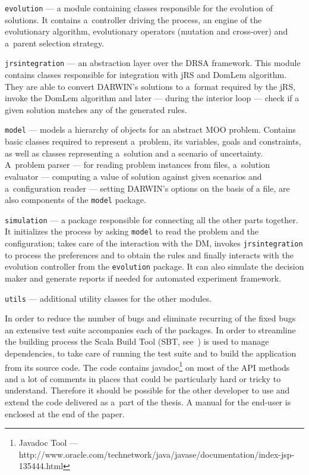 \begin{description}
  \item{\texttt{evolution}} --- a module containing classes responsible for
    the evolution of solutions. It contains a~controller driving the process,
    an engine of the evolutionary algorithm, evolutionary operators (mutation
    and cross-over) and a~parent selection strategy.

  \item{\texttt{jrsintegration}} --- an abstraction layer over the DRSA
    framework. This module contains classes responsible for integration with
    jRS and DomLem algorithm. They are able to convert DARWIN's solutions to
    a~format required by the jRS, invoke the DomLem algorithm and later ---
    during the interior loop --- check if a given solution matches any of the
    generated rules.

  \item{\texttt{model}} --- models a hierarchy of objects for an abstract MOO
    problem. Contains basic classes required to represent a~problem, its
    variables, goals and constraints, as well as classes representing
    a~solution and a scenario of uncertainty. A~problem parser --- for reading
    problem instances from files, a~solution evaluator --- computing a value
    of solution against given scenarios and a~configuration reader --- setting
    DARWIN's options on the basis of a file, are also components of the
    \texttt{model} package.
  \item{\texttt{simulation}} --- a package responsible for connecting all the
    other parts together. It initializes the process by asking \texttt{model}
    to read the problem and the configuration; takes care of the interaction
    with the DM, invokes \texttt{jrsintegration} to process the preferences
    and to obtain the rules and finally interacts with the evolution
    controller from the \texttt{evolution} package. It can also simulate the
    decision maker and generate reports if needed for automated experiment
    framework.

  \item{\texttt{utils}} --- additional utility classes for the other modules.
\end{description}

In order to reduce the number of bugs and eliminate recurring of the fixed
bugs an extensive test suite accompanies each of the packages. In order to
streamline the building process the Scala Build Tool (SBT, see~\cite{sbt10})
is used to manage dependencies, to take care of running the test suite and to
build the application from its source code. The code contains
javadoc\footnote{Javadoc Tool ---
  http://www.oracle.com/technetwork/java/javase/documentation/index-jsp-135444.html}
on most of the API methods and a lot of comments in places that could be
particularly hard or tricky to understand. Therefore it should be possible for
the other developer to use and extend the code delivered as a~part of the
thesis. A manual for the end-user is enclosed at the end of the paper.

